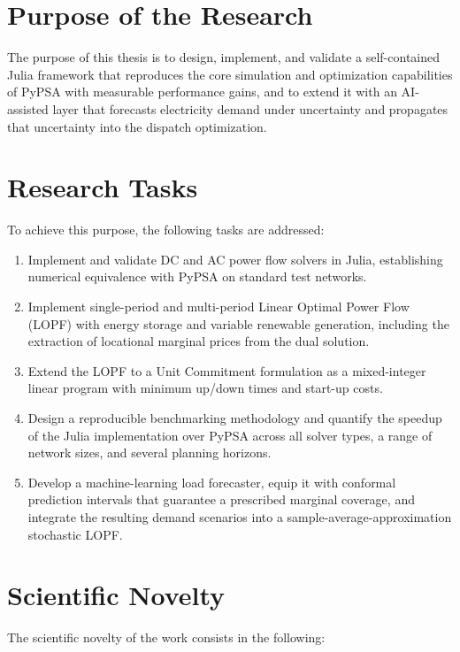 \section*{Purpose of the Research}

The purpose of this thesis is to design, implement, and validate a self-contained Julia framework that reproduces the core simulation and optimization capabilities of PyPSA with measurable performance gains, and to extend it with an AI-assisted layer that forecasts electricity demand under uncertainty and propagates that uncertainty into the dispatch optimization.

\section*{Research Tasks}

To achieve this purpose, the following tasks are addressed:

\begin{enumerate}
    \item Implement and validate DC and AC power flow solvers in Julia, establishing numerical equivalence with PyPSA on standard test networks.
    \item Implement single-period and multi-period Linear Optimal Power Flow (LOPF) with energy storage and variable renewable generation, including the extraction of locational marginal prices from the dual solution.
    \item Extend the LOPF to a Unit Commitment formulation as a mixed-integer linear program with minimum up/down times and start-up costs.
    \item Design a reproducible benchmarking methodology and quantify the speedup of the Julia implementation over PyPSA across all solver types, a range of network sizes, and several planning horizons.
    \item Develop a machine-learning load forecaster, equip it with conformal prediction intervals that guarantee a prescribed marginal coverage, and integrate the resulting demand scenarios into a sample-average-approximation stochastic LOPF.
\end{enumerate}

\section*{Scientific Novelty}

The scientific novelty of the work consists in the following:

